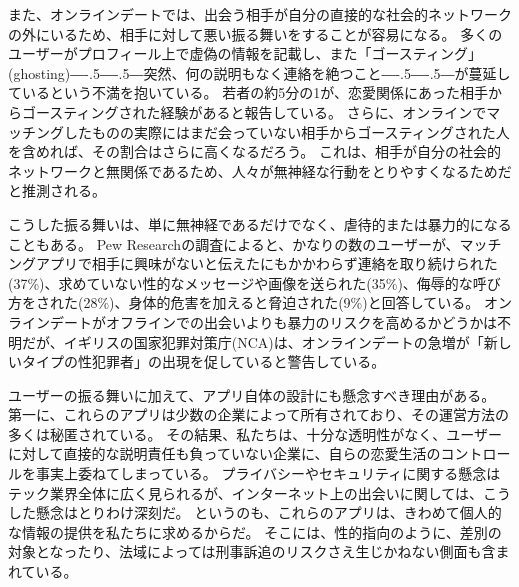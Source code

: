 \documentclass[paper=a4,book,openany]{jlreq}
\newcommand{\ig}[1]{}           %
\def\DDASH{―\kern-.5\zw―\kern-.5\zw―} %
\begin{document}
また、オンラインデートでは、出会う相手が自分の直接的な社会的ネットワークの外にいるため、相手に対して悪い振る舞いをすることが容易になる。
多くのユーザーがプロフィール上で虚偽の情報を記載し、また「ゴースティング」(ghosting){\DDASH}突然、何の説明もなく連絡を絶つこと{\DDASH}が蔓延しているという不満を抱いている。
若者の約5分の1が、恋愛関係にあった相手からゴースティングされた経験があると報告している\citep{yougov14:_poll_resul,navarro20:_psyc_corr_ghos_bread_exper}。
さらに、オンラインでマッチングしたものの実際にはまだ会っていない相手からゴースティングされた人を含めれば、その割合はさらに高くなるだろう。
これは、相手が自分の社会的ネットワークと無関係であるため、人々が無神経な行動をとりやすくなるためだと推測される。

こうした振る舞いは、単に無神経であるだけでなく、虐待的または暴力的になることもある。
Pew Researchの調査によると、かなりの数のユーザーが、マッチングアプリで相手に興味がないと伝えたにもかかわらず連絡を取り続けられた(37\%)、求めていない性的なメッセージや画像を送られた(35\%)、侮辱的な呼び方をされた(28\%)、身体的危害を加えると脅迫された(9\%)と回答している\citep{anderson20:_virt_down_onlin_datin}。
\ig{Monica Anderson}
オンラインデートがオフラインでの出会いよりも暴力のリスクを高めるかどうかは不明だが、イギリスの国家犯罪対策庁(NCA)は、オンラインデートの急増が「新しいタイプの性犯罪者」の出現を促していると警告している\citep{doria20:_are_datin_apps_safe_unsaf}。

ユーザーの振る舞いに加えて、アプリ自体の設計にも懸念すべき理由がある。
第一に、これらのアプリは少数の企業によって所有されており、その運営方法の多くは秘匿されている。
その結果、私たちは、十分な透明性がなく、ユーザーに対して直接的な説明責任も負っていない企業に、自らの恋愛生活のコントロールを事実上委ねてしまっている。
プライバシーやセキュリティに関する懸念はテック業界全体に広く見られるが、インターネット上の出会いに関しては、こうした懸念はとりわけ深刻だ。
というのも、これらのアプリは、きわめて個人的な情報の提供を私たちに求めるからだ。
そこには、性的指向のように、差別の対象となったり、法域によっては刑事訴追のリスクさえ生じかねない側面も含まれている。
\end{document}
